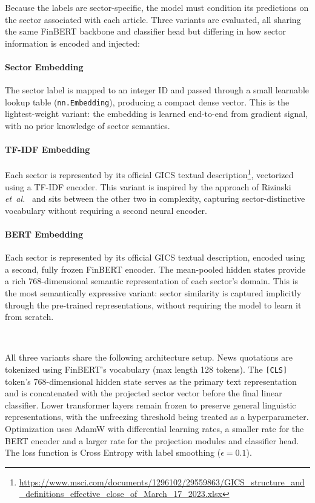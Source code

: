 Because the labels are sector-specific, the model must condition its predictions on the sector associated with each article. Three variants are evaluated, all sharing the same FinBERT backbone and classifier head but differing in how sector information is encoded and injected:

\paragraph{Sector Embedding} The sector label is mapped to an integer ID and passed through a small learnable lookup table (\texttt{nn.Embedding}), producing a compact dense vector. This is the lightest-weight variant: the embedding is learned end-to-end from gradient signal, with no prior knowledge of sector semantics.

\paragraph{TF-IDF Embedding} Each sector is represented by its official GICS textual description\footnote{\url{https://www.msci.com/documents/1296102/29559863/GICS_structure_and_definitions_effective_close_of_March_17_2023.xlsx}}, vectorized using a TF-IDF encoder. This variant is inspired by the approach of Rizinski \emph{et~al.}~\cite{558b2} and sits between the other two in complexity, capturing sector-distinctive vocabulary without requiring a second neural encoder.

\paragraph{BERT Embedding} Each sector is represented by its official GICS textual description, encoded using a second, fully frozen FinBERT encoder. The mean-pooled hidden states provide a rich 768-dimensional semantic representation of each sector's domain. This is the most semantically expressive variant: sector similarity is captured implicitly through the pre-trained representations, without requiring the model to learn it from scratch.

$\ $

\noindent All three variants share the following architecture setup. News quotations are tokenized using FinBERT's vocabulary (max length 128 tokens). The \texttt{[CLS]} token's 768-dimensional hidden state serves as the primary text representation and is concatenated with the projected sector vector before the final linear classifier. Lower transformer layers remain frozen to preserve general linguistic representations, with the unfreezing threshold being treated as a hyperparameter. Optimization uses AdamW with differential learning rates, a smaller rate for the BERT encoder and a larger rate for the projection modules and classifier head. The loss function is Cross Entropy with label smoothing ($\epsilon = 0.1$).

